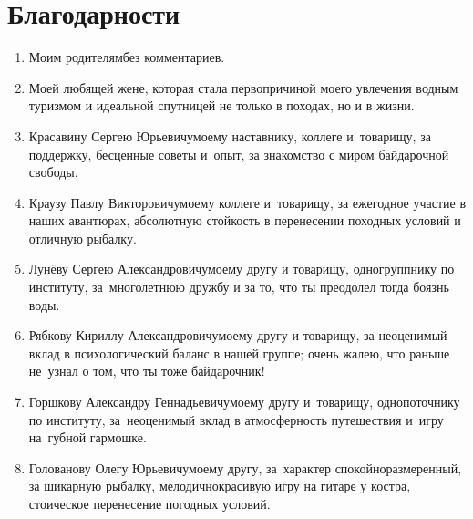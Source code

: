 \newpage
{
\thispagestyle{empty}
\section*{Благодарности}

\begin{enumerate}
\item Моим родителям\mdash без комментариев.
%
\item Моей любящей жене, которая стала первопричиной моего увлечения водным туризмом и идеальной спутницей не только в походах, но и в жизни.
%
\item Красавину\: Сергею\: Юрьевичу\mdash моему наставнику, коллеге и~товарищу, за поддержку, бесценные советы и~опыт, за знакомство с миром байдарочной свободы.
%
\item Краузу\: Павлу\: Викторовичу\mdash моему коллеге и~товарищу, за ежегодное участие в наших авантюрах, абсолютную стойкость в перенесении походных условий и отличную рыбалку.
%
\item Лунёву\: Сергею\: Александровичу\mdash моему другу и товарищу, одногруппнику по институту, за~многолетнюю дружбу и за то, что ты преодолел тогда боязнь воды.
%
\item Рябкову\: Кириллу\: Александровичу\mdash моему другу и товарищу, за неоценимый вклад в психологический баланс в нашей группе; очень жалею, что раньше не~узнал о том, что ты тоже байдарочник!
%
\item Горшкову\: Александру\: Геннадьевичу\mdash моему другу и~товарищу, однопоточнику по институту, за~неоценимый вклад в атмосферность путешествия и~игру на~губной гармошке.
%
\item Голованову\: Олегу\: Юрьевичу\mdash моему другу, за~характер спокойно\sdash размеренный, за шикарную рыбалку, мелодично\sdash красивую игру на гитаре у костра, стоическое перенесение погодных условий.

\end{enumerate}
}
